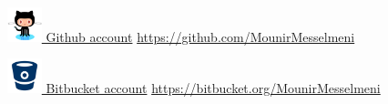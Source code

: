\documentclass[11pt,a4paper,sans]{moderncv} %
\begin{document}





\href{https://github.com/MounirMesselmeni}{\includegraphics[width=1cm,height=1cm]{pictures/github.png}
Github account}
\url{https://github.com/MounirMesselmeni}

\href{https://bitbucket.org/MounirMesselmeni}{\includegraphics[width=1cm,height=1cm]{pictures/bitbucket.png}
Bitbucket account}
\url{https://bitbucket.org/MounirMesselmeni}




\end{document}
